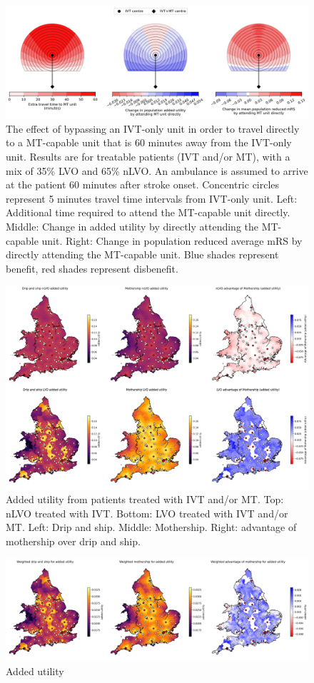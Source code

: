 \begin{figure}
\centering
\includegraphics[width=1.0\textwidth]{./images/circle_plots_t-IVT-to-MT=60_t-onset-to-ambo=60}
\caption{The effect of bypassing an IVT-only unit in order to travel directly to a MT-capable unit that is 60 minutes away from the IVT-only unit. Results are for treatable patients (IVT and/or MT), with a mix of 35\% LVO and 65\% nLVO. An ambulance is assumed to arrive at the patient 60 minutes after stroke onset. Concentric circles represent 5 minutes travel time intervals from IVT-only unit. Left: Additional time required to attend the MT-capable unit  directly. Middle: Change in added utility by directly attending the MT-capable unit. Right: Change in population reduced average mRS by directly attending the MT-capable unit. Blue shades represent benefit, red shades represent disbenefit.}
\label{fig:added_utility_six_in_one}
\end{figure}

\begin{figure}
\centering
\includegraphics[width=1.0\textwidth]{./maps/added_utility_six_in_one}
\caption{Added utility from patients treated with IVT and/or MT. Top: nLVO treated with IVT. Bottom: LVO treated with IVT and/or MT. Left: Drip and ship. Middle: Mothership. Right: advantage of mothership over drip and ship. }
\label{fig:added_utility_six_in_one}
\end{figure}

\begin{figure}
\centering
\includegraphics[width=1.0\textwidth]{./maps/added_utility_weighted_results}
\caption{Added utility }
\label{fig:added_utility_six_in_one}
\end{figure}